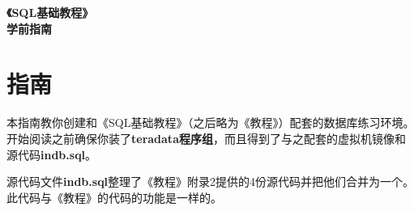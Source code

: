 \documentclass{article}
\begin{document}
	\begin{titlepage}
   		\begin{center}
      		\LARGE\textbf{《SQL基础教程》}\\
      		\LARGE\textbf{学前指南}
   		\end{center}
	\end{titlepage}

	\section*{指南}
		本指南教你创建和《SQL基础教程》（之后略为《教程》）配套的数据库练习环境。
		开始阅读之前确保你装了\textbf{teradata程序组}，而且得到了与之配套的虚拟机镜像和源代码\textbf{indb.sql}。

		源代码文件\textbf{indb.sql}整理了《教程》附录2提供的4份源代码并把他们合并为一个。此代码与《教程》的代码的功能是一样的。





			



			
\end{document}
